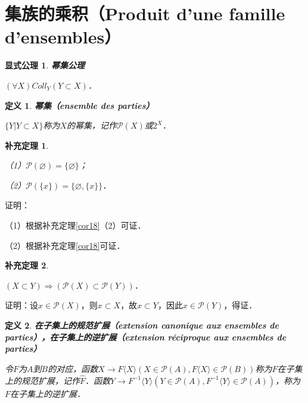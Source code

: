 \documentclass[12pt, a4paper, oneside]{book}
\newtheorem{ex}{显式公理}
\newtheorem{cor}{补充定理}
\newtheorem{de}{定义}
\begin{document}
		\section{集族的乘积（Produit d'une famille d'ensembles）}

			\begin{ex}\label{ex3}
				\textbf{幂集公理}
				\par
				$(\forall X)Coll_Y(Y\subset X)$．
			\end{ex}
			
			\begin{de}
				\textbf{幂集（ensemble des parties）}
				\par
				$\{Y|Y\subset X\}$称为$X$的幂集，记作$\mathcal{P}(X)$或$2^X$．
			\end{de}

			\begin{cor}\label{cor117}
				\hfill\par
				（1）$ \mathcal{P}(\varnothing)=\{\varnothing\}$；
				\par 
				（2）$ \mathcal{P}(\{x\})=\{\varnothing, \{x\}\}$．
			\end{cor}
			证明：
			\par
			（1）根据补充定理\ref{cor18}（2）可证．
			\par
			（2）根据补充定理\ref{cor18}可证．

			\begin{cor}\label{cor118}
				\hfill\par
				$(X\subset Y)\Rightarrow( \mathcal{P}(X)\subset \mathcal{P}(Y))$．
			\end{cor}
			证明：设$x\in \mathcal{P}(X)$，则$x\subset X$，故$x\subset Y$，因此$x\in \mathcal{P}(Y)$，得证．
			
			\begin{de}
				\textbf{在子集上的规范扩展（extension canonique aux ensembles de parties），在子集上的逆扩展（extension réciproque aux ensembles de parties）}
				\par
				令$F$为$A$到$B$的对应，函数$X\to F\langle X \rangle (X\in \mathcal{P}(A), F\langle X \rangle \in \mathcal{P}(B))$称为$F$在子集上的规范扩展，记作$\hat{F}$．函数$Y\to F^{-1}\langle Y \rangle (Y\in \mathcal{P}(A), F^{-1}\langle Y \rangle \in \mathcal{P}(A))$，称为$F$在子集上的逆扩展．
			\end{de}
			
\end{document}
